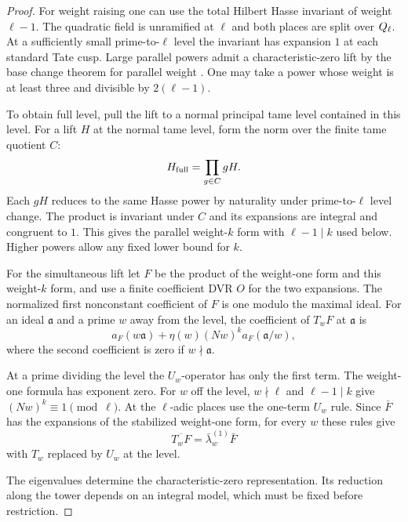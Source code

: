 \begin{proof}
For weight raising one can use
the total Hilbert Hasse invariant of weight \(\ell-1\).
The quadratic field is unramified at \(\ell\) and both
places are split over \(Q_\ell\). At a sufficiently small prime-to-\(\ell\) level the invariant
has expansion \(1\) at each standard Tate cusp. Large parallel
powers admit a characteristic-zero lift by the base change
theorem for parallel weight
\cite[Lemmas 2.2 and 2.3]{deo-dimitrov-wiese}.
One may take a power whose weight is at least three and
divisible by \(2(\ell-1)\).

To obtain full level, pull the
lift to a normal principal tame level contained in this
level. For a lift \(H\) at the normal tame level, form the norm over
the finite tame quotient \(C\):
\[
               H_{\rm full}=\prod_{g\in C}gH.
\]
Each \(gH\) reduces to the same Hasse power by naturality
under prime-to-\(\ell\) level change. The product is invariant
under \(C\) and its expansions are integral and congruent to \(1\). This gives the parallel weight-\(k\)
form with \(\ell-1\mid k\) used below. Higher powers allow
any fixed lower bound for \(k\).


For the simultaneous lift let
\(F\) be the product of the weight-one form and this
weight-\(k\) form, and use a finite coefficient DVR
\(O\) for the two expansions. The normalized first
nonconstant coefficient of \(F\) is one modulo the
maximal ideal. For an ideal \(\mathfrak a\) and a prime
\(w\) away from the level, the coefficient of \(T_w F\)
at \(\mathfrak a\) is
\[
 a_F(w\mathfrak a)+\eta(w)(Nw)^k a_F(\mathfrak a/w),
\]
where the second coefficient is zero if \(w\nmid\mathfrak a\).

At a prime dividing the level the \(U_w\)-operator has
only the first term. The weight-one formula has exponent
zero. For \(w\) off the level, \(w\nmid\ell\) and
\(\ell-1\mid k\) give \((Nw)^k\equiv1\pmod\ell\).
At the \(\ell\)-adic places use the one-term \(U_w\) rule.
Since \(\bar F\) has the expansions of the stabilized
weight-one form, for every \(w\) these rules give
\[
          \overline{T_wF}=\bar\lambda^{(1)}_w\bar F
\]
with \(T_w\) replaced by \(U_w\) at the level.


The eigenvalues determine the characteristic-zero representation. Its reduction along the tower depends on an integral model, which must be fixed before restriction.



\end{proof}
